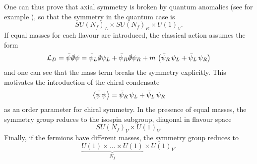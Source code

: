 One can thus prove that axial symmetry is broken by quantum anomalies (see for example \cite{schwartz}), so that the symmetry in the quantum case is
\begin{equation*}
    SU(N_f)_L \times SU(N_f)_R \times U(1)_V.
\end{equation*}
If equal masses for each flavour are introduced, the classical action assumes the form 
\begin{equation} 
    \mathcal{L}_D = \bar\psi \slashed{\partial} \psi = \bar\psi_L \slashed{\partial} \psi_L + \bar\psi_R \slashed{\partial} \psi_R + m \, \left(\bar\psi_R \, \psi_L + \bar\psi_L \, \psi_R \right)
\end{equation} 
and one can see that the mass term breaks the symmetry explicitly. This motivates the introduction of the chiral condensate
\begin{equation*}
    \left\langle \bar\psi \, \psi \right\rangle = \bar\psi_R \, \psi_L + \bar\psi_L \, \psi_R
\end{equation*}
as an order parameter for chiral symmetry. 
In the presence of equal masses, the symmetry group reduces to the isospin subgroup, diagonal in flavour space
\begin{equation*}
    SU(N_f)_V \times U(1)_V.
\end{equation*}
Finally, if the fermions have different masses, the symmetry group reduces to 
\begin{equation*}
    \underbrace{U(1) \times \dots \times U(1)}_{N_f} \times U(1)_V.
\end{equation*}
\newpage
